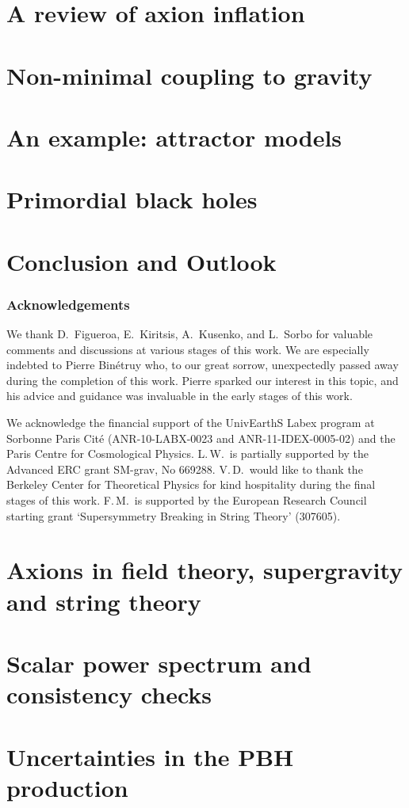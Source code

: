 \documentclass[12pt,titlepage]{article}
\numberwithin{equation}{section}
\numberwithin{figure}{section}
\numberwithin{table}{section}
\begin{document}
\section{A review of axion inflation\label{sec:review}}


\section{Non-minimal coupling to gravity\label{sec:non-minimal}}



\section{An example: attractor models\label{sec:attractors}}


\section{Primordial black holes \label{sec:PBHs}}


\section{Conclusion and Outlook \label{sec:conclusions}}


\vspace{1cm}
\subsubsection*{Acknowledgements}

We thank D.~Figueroa, E.~Kiritsis, A.~Kusenko, and L.~Sorbo for valuable comments and discussions at various stages of this work. We are especially indebted to Pierre Bin\'etruy who, to our great sorrow, unexpectedly passed away during the completion of this work. Pierre sparked our interest in this topic, and his advice and guidance was invaluable in the early stages of this work.

We acknowledge the financial support of the UnivEarthS Labex program at Sorbonne Paris Cit\'e (ANR-10-LABX-0023 and ANR-11-IDEX-0005-02) and the Paris Centre for Cosmological Physics. L.\,W.\ is partially supported by the Advanced ERC grant SM-grav, No 669288. V.\,D.\ would like to thank the Berkeley Center for Theoretical Physics for kind hospitality during the final stages of this work. F.\,M.\ is supported by the European Research Council starting grant ‘Supersymmetry Breaking in String Theory’ (307605).


\appendix

\section{Axions in field theory, supergravity and string theory \label{sec:axions}}


\section{Scalar power spectrum and consistency checks \label{sec:spectrum}}


\section{Uncertainties in the PBH production}







\end{document}
